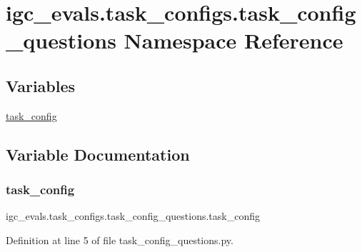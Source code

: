 \hypertarget{namespaceigc__evals_1_1task__configs_1_1task__config__questions}{}\section{igc\+\_\+evals.\+task\+\_\+configs.\+task\+\_\+config\+\_\+questions Namespace Reference}
\label{namespaceigc__evals_1_1task__configs_1_1task__config__questions}
\subsection*{Variables}
\begin{DoxyCompactItemize}
\item 
\hyperlink{namespaceigc__evals_1_1task__configs_1_1task__config__questions_a38150718703071fdb0df9c348899e842}{task\+\_\+config}
\end{DoxyCompactItemize}


\subsection{Variable Documentation}
\mbox{\label{namespaceigc__evals_1_1task__configs_1_1task__config__questions_a38150718703071fdb0df9c348899e842}} 
\subsubsection{\texorpdfstring{task\+\_\+config}{task\_config}}
{\footnotesize\ttfamily igc\+\_\+evals.\+task\+\_\+configs.\+task\+\_\+config\+\_\+questions.\+task\+\_\+config}



Definition at line 5 of file task\+\_\+config\+\_\+questions.\+py.

